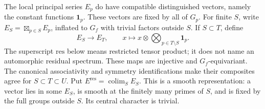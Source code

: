 The local principal series $E_p$ do have compatible distinguished vectors,
namely the constant functions $\mathbf1_p$. These vectors are fixed by
all of $G_p$. For finite $S$, write $E_S=\boxtimes_{p\in S}E_p$, inflated
to $G_f$ with trivial factors outside $S$. If $S\subset T$, define
\[
 E_S\longrightarrow E_T,\qquad
 x\longmapsto x\otimes\bigotimes_{p\in T\setminus S}\mathbf1_p.
\]
The superscript $\mathrm{res}$ below means restricted tensor product; it does not name an automorphic residual spectrum. These maps are injective and $G_f$-equivariant. The canonical associativity
and symmetry identifications make their composites agree for
$S\subset T\subset U$. Put $E^{\mathrm{res}}=\operatorname{colim}_S E_S$.
This is a smooth representation: a vector lies in some $E_S$, is smooth
at the finitely many primes of $S$, and is fixed by the full groups
outside $S$. Its central character is trivial.

